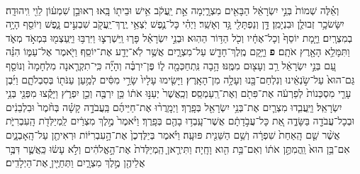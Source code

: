 \documentclass[twoside, openany, parskip=half, 11pt]{book}
\begin{document}
\begin{footnotesize}
\begin{multicols}{2}
\\
 וְאֵ֗לֶּה שְׁמוֹת֙ בְּנֵ֣י יִשְׂרָאֵ֔ל הַבָּאִ֖ים מִצְרָ֑יְמָה אֵ֣ת יַֽעֲקֹ֔ב אִ֥ישׁ וּבֵית֖וֹ בָּֽאוּ׃ רְאוּבֵ֣ן שִׁמְע֔וֹן לֵוִ֖י וִֽיהוּדָֽה׃ יִשָּׂשׂכָ֥ר זְבוּלֻ֖ן וּבִנְיָמִֽן׃ דָּ֥ן וְנַפְתָּלִ֖י גָּ֥ד וְאָשֵֽׁר׃ וַיְהִ֗י כָּל־נֶ֛פֶשׁ יֹֽצְאֵ֥י יֶֽרֶךְ־יַֽעֲקֹ֖ב שִׁבְעִ֣ים נָ֑פֶשׁ וְיוֹסֵ֖ף הָיָ֥ה בְמִצְרָֽיִם׃ וַיָּ֤מָת יוֹסֵף֙ וְכָל־אֶחָ֔יו וְכֹ֖ל הַדּ֥וֹר הַהֽוּא׃ וּבְנֵ֣י יִשְׂרָאֵ֗ל פָּר֧וּ וַֽיִּשְׁרְצ֛וּ וַיִּרְבּ֥וּ וַיַּֽעַצְמ֖וּ בִּמְאֹ֣ד מְאֹ֑ד וַתִּמָּלֵ֥א הָאָ֖רֶץ אֹתָֽם׃ \textbf{פ} 
וַיָּ֥קָם מֶֽלֶךְ־חָדָ֖שׁ עַל־מִצְרָ֑יִם אֲשֶׁ֥ר לֹֽא־יָדַ֖ע אֶת־יוֹסֵֽף׃ וַיֹּ֖אמֶר אֶל־עַמּ֑וֹ הִנֵּ֗ה עַ֚ם בְּנֵ֣י יִשְׂרָאֵ֔ל רַ֥ב וְעָצ֖וּם מִמֶּֽנּוּ׃ הָ֥בָה נִּֽתְחַכְּמָ֖ה ל֑וֹ פֶּן־יִרְבֶּ֗ה וְהָיָ֞ה כִּֽי־תִקְרֶ֤אנָה מִלְחָמָה֙ וְנוֹסַ֤ף גַּם־הוּא֙ עַל־שֹׂ֣נְאֵ֔ינוּ וְנִלְחַם־בָּ֖נוּ וְעָלָ֥ה מִן־הָאָֽרֶץ׃ וַיָּשִׂ֤ימוּ עָלָיו֙ שָׂרֵ֣י מִסִּ֔ים לְמַ֥עַן עַנֹּת֖וֹ בְּסִבְלֹתָ֑ם וַיִּ֜בֶן עָרֵ֤י מִסְכְּנוֹת֙ לְפַרְעֹ֔ה אֶת־פִּתֹ֖ם וְאֶת־רַֽעַמְסֵֽס׃ וְכַֽאֲשֶׁר֙ יְעַנּ֣וּ אֹת֔וֹ כֵּ֥ן יִרְבֶּ֖ה וְכֵ֣ן יִפְרֹ֑ץ וַיָּקֻ֕צוּ מִפְּנֵ֖י בְּנֵ֥י יִשְׂרָאֵֽל׃  וַיַּֽעֲבִ֧דוּ מִצְרַ֛יִם אֶת־בְּנֵ֥י יִשְׂרָאֵ֖ל בְּפָֽרֶךְ׃ וַיְמָֽרֲר֨וּ אֶת־חַיֵּיהֶ֜ם בַּֽעֲבֹדָ֣ה קָשָׁ֗ה בְּחֹ֨מֶר֙ וּבִלְבֵנִ֔ים וּבְכָל־עֲבֹדָ֖ה בַּשָּׂדֶ֑ה אֵ֚ת כָּל־עֲבֹ֣דָתָ֔ם אֲשֶׁר־עָֽבְד֥וּ בָהֶ֖ם בְּפָֽרֶךְ׃ וַיֹּ֨אמֶר֙ מֶ֣לֶךְ מִצְרַ֔יִם לַֽמְיַלְּדֹ֖ת הָֽעִבְרִיֹּ֑ת אֲשֶׁ֨ר שֵׁ֤ם הָֽאַחַת֙ שִׁפְרָ֔ה וְשֵׁ֥ם הַשֵּׁנִ֖ית פּוּעָֽה׃ וַיֹּ֗אמֶר בְּיַלֶּדְכֶן֙ אֶת־הָ֣עִבְרִיּ֔וֹת וּרְאִיתֶ֖ן עַל־הָֽאָבְנָ֑יִם אִם־בֵּ֥ן הוּא֙ וַֽהֲמִתֶּ֣ן אֹת֔וֹ וְאִם־בַּ֥ת הִ֖וא וָחָֽיָה׃ וַתִּירֶ֤אןָ הַֽמְיַלְּדֹת֙ אֶת־הָ֣אֱלֹהִ֔ים וְלֹ֣א עָשׂ֔וּ כַּֽאֲשֶׁ֛ר דִּבֶּ֥ר אֲלֵיהֶ֖ן מֶ֣לֶךְ מִצְרָ֑יִם וַתְּחַיֶּ֖יןָ אֶת־הַיְלָדִֽים׃


\end{multicols}
\end{footnotesize}
\end{document}
